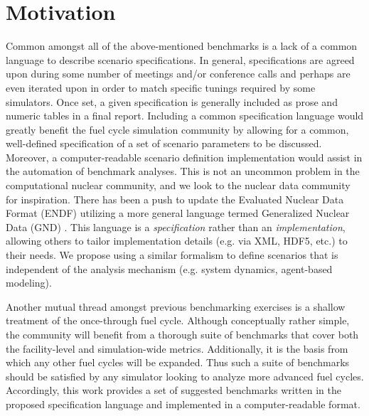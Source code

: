 \documentclass{anstrans}
\begin{document}
\section{Motivation}
Common amongst all of the above-mentioned benchmarks is a lack of a common
language to describe scenario specifications. In general, specifications are
agreed upon during some number of meetings and/or conference calls and perhaps
are even iterated upon in order to match specific tunings required by some
simulators. Once set, a given specification is generally included as prose and
numeric tables in a final report. Including a common specification language
would greatly benefit the fuel cycle simulation community by allowing for a
common, well-defined specification of a set of scenario parameters to be
discussed. Moreover, a computer-readable scenario definition implementation
would assist in the automation of benchmark analyses. This is not an uncommon
problem in the computational nuclear community, and we look to the nuclear data
community for inspiration. There has been a push to update the Evaluated Nuclear
Data Format (ENDF) utilizing a more general language termed Generalized Nuclear
Data (GND) \cite{mattoon_generalized_2012}. This language is a
\emph{specification} rather than an \emph{implementation}, allowing others to
tailor implementation details (e.g. via XML, HDF5, etc.) to their needs. We
propose using a similar formalism to define scenarios that is independent of the
analysis mechanism (e.g. system dynamics, agent-based modeling).

Another mutual thread amongst previous benchmarking exercises is a shallow
treatment of the once-through fuel cycle. Although conceptually rather simple,
the community will benefit from a thorough suite of benchmarks that cover both
the facility-level and simulation-wide metrics. Additionally, it is the basis
from which any other fuel cycles will be expanded.  Thus such a suite of
benchmarks should be satisfied by any simulator looking to analyze more advanced
fuel cycles. Accordingly, this work provides a set of suggested benchmarks
written in the proposed specification language and implemented in a
computer-readable format.

\end{document}
